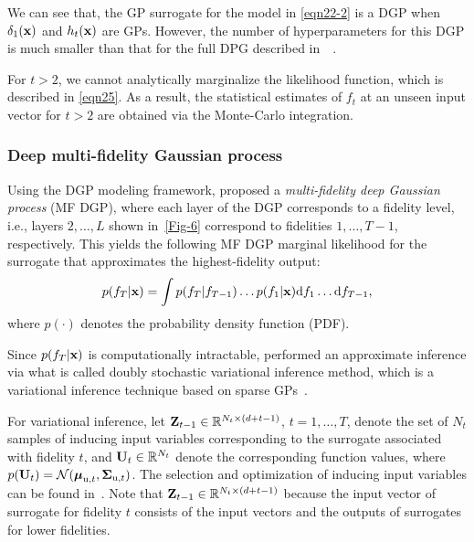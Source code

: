 \documentclass[journal ]{new-aiaa}
\begin{document}
	We can see that, the GP surrogate for the model in \cref{eqn22-2} is a DGP when $\delta_1(\bf x)$ and $h_{t}(\bf x)$ are GPs.
	However, the number of hyperparameters for this DGP is much smaller than that for the full DPG described in~~\citep{Perdikaris2017}. 
	
	For $t>2$, we cannot analytically marginalize the likelihood function, which is described in \cref{eqn25}.
	As a result, the statistical estimates of $f_{t}$ at an unseen input vector for $t>2$ are obtained via the Monte-Carlo integration.
	
	\subsubsection{Deep multi-fidelity Gaussian process}\label{Sec453}
	
	Using the DGP modeling framework, \citet{Cutajar2019} proposed a \textit{multi-fidelity deep Gaussian process} (MF DGP),
	where each layer of the DGP corresponds to a fidelity level, i.e., layers $2,\dots,L$ shown in~\cref{Fig-6}
	correspond to fidelities $1,\dots,T-1$, respectively.
	This yields the following MF DGP marginal likelihood for the surrogate that approximates the highest-fidelity output:
	\begin{equation}\label{eqn25}
		p(f_{T}|{\bf x}) = \int p(f_{T}|f_{T-1})\dots p(f_{1}|{\bf x}) \text{d}f_{1} \dots \text{d}f_{T-1},
	\end{equation}
	where $p(\cdot)$ denotes the probability density function (PDF).
	
	Since $p(f_{T}|{\bf x})$ is computationally intractable, \citet{Cutajar2019} performed an approximate inference via what is called doubly stochastic variational inference method, which is a variational inference technique based on sparse GPs~\citep{Salimbeni2017}.
	
	For variational inference, let  ${\bf Z}_{t-1} \in \mathbb{R}^{N_t \times {(d+t-1)}}$, $t=1,\dots,T$, denote the set of $N_t$ samples of inducing input variables corresponding to the surrogate associated with fidelity $t$, and ${\bf U}_{t} \in \mathbb{R}^{N_t}$ denote the corresponding function values, where $p({\bf U}_{t}) = \mathcal{N}({\boldsymbol \mu}_{\text{u},t},{\boldsymbol \Sigma}_{\text{u},t})$.
	The selection and optimization of inducing input variables can be found in~\citet{Titsias2009}.
	Note that ${\bf Z}_{t-1} \in \mathbb{R}^{N_t \times {(d+t-1)}}$ because the input vector of surrogate for fidelity $t$ consists of the input vectors and the outputs of surrogates for lower fidelities.
	
\end{document}
